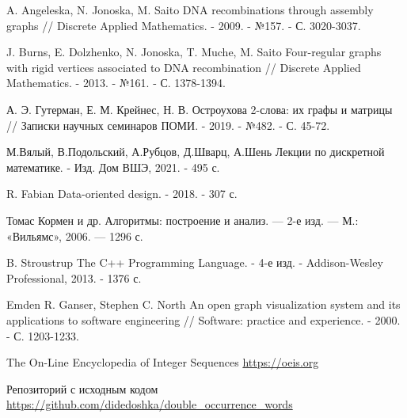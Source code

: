 \documentclass[a4paper,fleqn,12pt,top=0pt]{article}
\theoremstyle{plain}
\theoremstyle{definition}
\theoremstyle{remark}
\begin{document}
\newpage
\begin{thebibliography}{00}
	A. Angeleska, N. Jonoska, M. Saito DNA recombinations through assembly graphs // Discrete Applied Mathematics. - 2009. - №157. - С. 3020-3037.

	J. Burns, E. Dolzhenko, N. Jonoska, T. Muche, M. Saito Four-regular graphs with rigid vertices associated to DNA recombination // Discrete Applied Mathematics. - 2013. - №161. - С. 1378-1394.

    А. Э. Гутерман, Е. М. Крейнес, Н. В. Остроухова 2-слова: их графы и матрицы // Записки научных семинаров ПОМИ. - 2019. - №482. - С. 45-72.

    М.Вялый, В.Подольский, А.Рубцов, Д.Шварц, А.Шень Лекции по дискретной математике. - Изд. Дом ВШЭ, 2021. - 495 с.

    R. Fabian Data-oriented design. - 2018. - 307 с.

    Томас Кормен и др. Алгоритмы: построение и анализ. — 2-е изд. — М.: «Вильямс», 2006. — 1296 с.

    B. Stroustrup The C++ Programming Language. - 4-е изд. - Addison-Wesley Professional, 2013. - 1376 с.

    Emden R. Ganser, Stephen C. North An open graph visualization system and its applications to software engineering // Software: practice and experience. - 2000. - С. 1203-1233.

     The On-Line Encyclopedia of Integer Sequences \url{https://oeis.org}

     Репозиторий с исходным кодом \url{https://github.com/didedoshka/double_occurrence_words}

\end{thebibliography}
\end{document}
